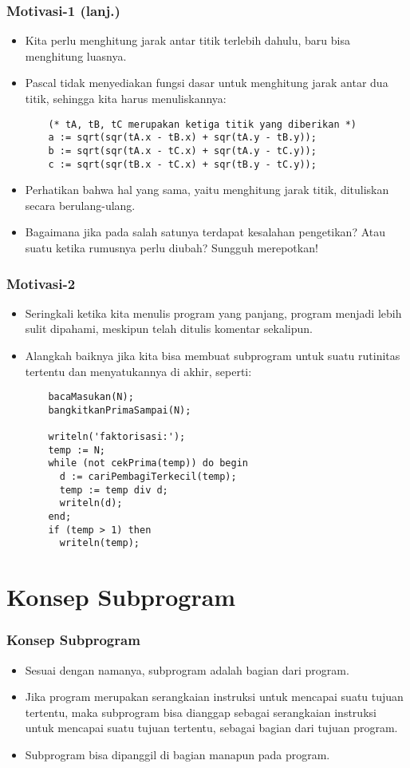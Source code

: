 \documentclass{beamer}
\begin{document}
\begin{frame}[fragile]
\frametitle{Motivasi-1 (lanj.)}
\begin{itemize}
  \item Kita perlu menghitung jarak antar titik terlebih dahulu, baru bisa menghitung luasnya.
  \item Pascal tidak menyediakan fungsi dasar untuk menghitung jarak antar dua titik, sehingga kita harus menuliskannya:
  \begin{lstlisting}
    (* tA, tB, tC merupakan ketiga titik yang diberikan *)
    a := sqrt(sqr(tA.x - tB.x) + sqr(tA.y - tB.y));
    b := sqrt(sqr(tA.x - tC.x) + sqr(tA.y - tC.y));
    c := sqrt(sqr(tB.x - tC.x) + sqr(tB.y - tC.y));
  \end{lstlisting}
  \item Perhatikan bahwa hal yang sama, yaitu menghitung jarak titik, dituliskan secara berulang-ulang.
  \item Bagaimana jika pada salah satunya terdapat kesalahan pengetikan? Atau suatu ketika rumusnya perlu diubah? Sungguh merepotkan!
\end{itemize}
\end{frame}

\begin{frame}[fragile]
\frametitle{Motivasi-2}
\begin{itemize}
  \item Seringkali ketika kita menulis program yang panjang, program menjadi lebih sulit dipahami, meskipun telah ditulis komentar sekalipun.
  \item Alangkah baiknya jika kita bisa membuat subprogram untuk suatu rutinitas tertentu dan menyatukannya di akhir, seperti:
  \begin{lstlisting}
    bacaMasukan(N);
    bangkitkanPrimaSampai(N);

    writeln('faktorisasi:');
    temp := N;
    while (not cekPrima(temp)) do begin
      d := cariPembagiTerkecil(temp);
      temp := temp div d;
      writeln(d);
    end;
    if (temp > 1) then
      writeln(temp);
  \end{lstlisting}
\end{itemize}
\end{frame}

\section{Konsep Subprogram}
\frame{\sectionpage}

\begin{frame}
\frametitle{Konsep Subprogram}
\begin{itemize}
  \item Sesuai dengan namanya, subprogram adalah bagian dari program.
  \item Jika program merupakan serangkaian instruksi untuk mencapai suatu tujuan tertentu, maka subprogram bisa dianggap sebagai serangkaian instruksi untuk mencapai suatu tujuan tertentu, \alert{sebagai bagian dari tujuan program}.
  \item Subprogram bisa dipanggil di bagian manapun pada program.
\end{itemize}
\end{frame}
\end{document}
